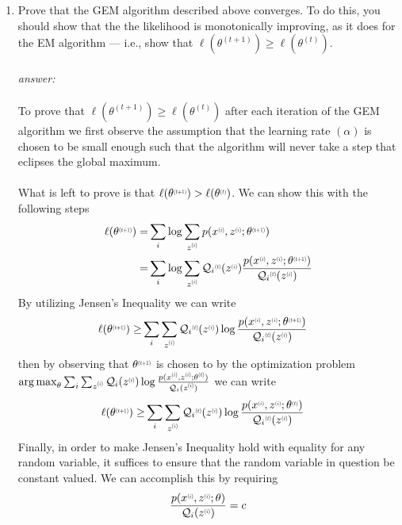 \documentclass{article}
\DeclareMathOperator*{\argmax}{arg\,max}
\newcommand{\supx}[1]{\scalebox{0.6}[0.75]{$^{(#1)}$}}
\newcommand{\supi}{\scalebox{0.6}[0.75]{$^{(i)}$}}
\begin{document}
\begin{enumerate}[label=(\alph*)]
    \item Prove that the GEM algorithm described above converges. To do this, you should show that the the likelihood is monotonically improving, as it does for the EM algorithm — i.e., show that $\ell(\theta^{(t+1)})\geq \ell(\theta^{(t)})$.\\\\
    \textit{answer:}\\\\
    To prove that $\ell(\theta^{(t+1)})\geq \ell(\theta^{(t)})$ after each iteration of the GEM algorithm we first observe the assumption that the learning rate $(\alpha)$ is chosen to be small enough such that the algorithm will never take a step that eclipses the global maximum.\\\\
    What is left to prove is that $\ell(\theta\supx{t+1}) > \ell(\theta\supx{t})$. We can show this with the following steps
    \begin{align*}
    \ell(\theta\supx{t+1}) =&{} \sum_i\log\sum_{z\supi}p(x\supi,z\supi;\theta\supx{t+1})\\
    =&{} \sum_i\log\sum_{z\supi}\mathcal{Q}_i\supx{t}(z\supi)\frac{p(x\supi,z\supi;\theta\supx{t+1})}{\mathcal{Q}_i\supx{t}(z\supi)}
    \end{align*}
    By utilizing Jensen's Inequality we can write
    \begin{align*}
        \ell(\theta\supx{t+1}) \geq&{} \sum_i\sum_{z\supi}\mathcal{Q}_i\supx{t}(z\supi)\log\frac{p(x\supi,z\supi;\theta\supx{t+1})}{\mathcal{Q}_i\supx{t}(z\supi)}
    \end{align*}
    then by observing that $\theta\supx{t+1}$ is chosen to by the optimization problem $\argmax_\theta\sum_i\sum_{z\supi}\mathcal{Q}_i(z\supi)\log\frac{p(x\supi,z\supi;\theta\supx{t})}{\mathcal{Q}_i(z\supi)}$ we can write
    \begin{align*}
    \ell(\theta\supx{t+1}) \geq&{} \sum_i\sum_{z\supi}\mathcal{Q}_i\supx{t}(z\supi)\log\frac{p(x\supi,z\supi;\theta\supx{t})}{\mathcal{Q}_i\supx{t}(z\supi)}
    \end{align*}
    Finally, in order to make Jensen's Inequality hold with equality for any random variable, it suffices to ensure that the random variable in question be constant valued. We can accomplish this by requiring
    \begin{align*}
        \frac{p(x\supi,z\supi;\theta)}{\mathcal{Q}_i(z\supi)} = c
    \end{align*}

\end{enumerate}
\end{document}
